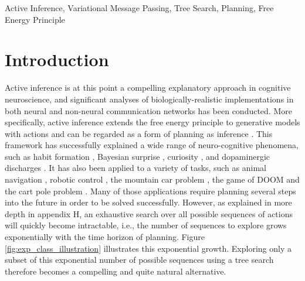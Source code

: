 \documentclass[twoside,11pt]{article}
\begin{document}
\begin{keywords}
Active Inference, Variational Message Passing, Tree Search, Planning, Free Energy Principle
\end{keywords}

\section{Introduction}

Active inference is at this point a compelling explanatory approach in cognitive neuroscience, and significant analyses of biologically-realistic implementations in both neural and non-neural communication networks has been conducted. More specifically, active inference extends the free energy principle to generative models with actions \citep{FRISTON2016862,AI_TUTO,AI_VMP} and can be regarded as a form of planning as inference \citep{PAI}. This framework has successfully explained a wide range of neuro-cognitive phenomena, such as habit formation \citep{FRISTON2016862}, Bayesian surprise \citep{bayes_surprise}, curiosity \citep{curiosity}, and dopaminergic discharges \citep{dopamine}. It has also been applied to a variety of tasks, such as animal navigation \citep{DeepAIwithMCMC}, robotic control \citep{pezzato2020active,sancaktar2020endtoend}, the mountain car problem \citep{catal2020learning}, the game of DOOM \citep{CULLEN2018809} and the cart pole problem \citep{cart_pole}. Many of those applications require planning several steps into the future in order to be solved successfully. However, as explained in more depth in appendix H, an exhaustive search over all possible sequences of actions will quickly become intractable, i.e., the number of sequences to explore grows exponentially with the time horizon of planning. Figure \ref{fig:exp_class_illustration} illustrates this exponential growth. Exploring only a subset of this exponential number of possible sequences using a tree search therefore becomes a compelling and quite natural alternative.
\end{document}

